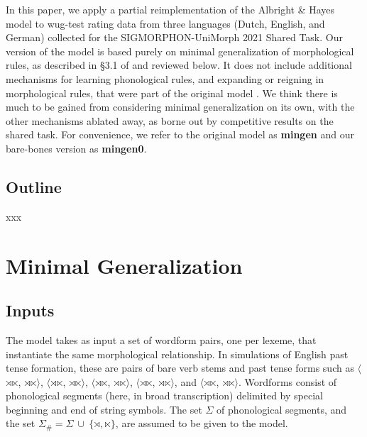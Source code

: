 \documentclass[11pt]{article}
\begin{document}
In this paper, we apply a partial reimplementation of the Albright \& Hayes model to wug-test rating data from three languages (Dutch, English, and German) collected for the SIGMORPHON-UniMorph 2021 Shared Task. Our version of the model is based purely on minimal generalization of morphological rules, as described in \S3.1 of \citet{albright2002a} and reviewed below. It does not include additional mechanisms for learning phonological rules, and expanding or reigning in morphological rules, that were part of the original model \citep[see][\S3.3 - \S3.7]{albright2002a}. We think there is much to be gained from considering minimal generalization on its own, with the other mechanisms ablated away, as borne out by competitive results on the shared task. For convenience, we refer to the original model as \textbf{mingen} and our bare-bones version as \textbf{mingen0}.

\subsection{Outline}

xxx

\section{Minimal Generalization}

\subsection{Inputs}

The model takes as input a set of wordform pairs, one per lexeme, that instantiate the same morphological relationship. In simulations of English past tense formation, these are pairs of bare verb stems and past tense forms such as $\langle$$\rtimes$$\ltimes$, $\rtimes$$\ltimes$$\rangle$, $\langle$$\rtimes$$\ltimes$, $\rtimes$$\ltimes$$\rangle$, $\langle$$\rtimes$$\ltimes$, $\rtimes$$\ltimes$$\rangle$, $\langle$$\rtimes$$\ltimes$, $\rtimes$$\ltimes$$\rangle$, and $\langle$$\rtimes$$\ltimes$, $\rtimes$$\ltimes$$\rangle$. Wordforms consist of phonological segments (here, in broad transcription) delimited by special beginning and end of string symbols. The set $\Sigma$ of phonological segments, and the set $\Sigma_{\#} = \Sigma \ \cup \ \{ \rtimes, \ltimes \}$, are assumed to be given to the model.
\end{document}
